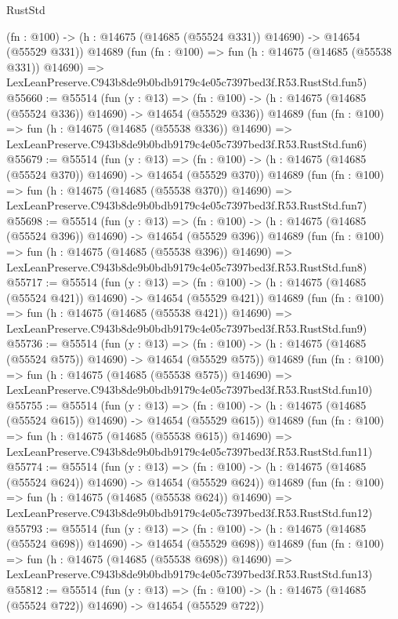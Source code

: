 \begin{lexlean}{RustStd}
\begin{coremodule}
    (fn : @100) -> (h : @14675 (@14685 (@55524 @331)) @14690) -> @14654 (@55529 @331))
    @14689
    (fun (fn : @100) =>
    fun (h : @14675 (@14685 (@55538 @331)) @14690) =>
    LexLeanPreserve.C943b8de9b0bdb9179c4e05c7397bed3f.R53.RustStd.fun5)
@55660 := @55514
    (fun (y : @13) =>
    (fn : @100) -> (h : @14675 (@14685 (@55524 @336)) @14690) -> @14654 (@55529 @336))
    @14689
    (fun (fn : @100) =>
    fun (h : @14675 (@14685 (@55538 @336)) @14690) =>
    LexLeanPreserve.C943b8de9b0bdb9179c4e05c7397bed3f.R53.RustStd.fun6)
@55679 := @55514
    (fun (y : @13) =>
    (fn : @100) -> (h : @14675 (@14685 (@55524 @370)) @14690) -> @14654 (@55529 @370))
    @14689
    (fun (fn : @100) =>
    fun (h : @14675 (@14685 (@55538 @370)) @14690) =>
    LexLeanPreserve.C943b8de9b0bdb9179c4e05c7397bed3f.R53.RustStd.fun7)
@55698 := @55514
    (fun (y : @13) =>
    (fn : @100) -> (h : @14675 (@14685 (@55524 @396)) @14690) -> @14654 (@55529 @396))
    @14689
    (fun (fn : @100) =>
    fun (h : @14675 (@14685 (@55538 @396)) @14690) =>
    LexLeanPreserve.C943b8de9b0bdb9179c4e05c7397bed3f.R53.RustStd.fun8)
@55717 := @55514
    (fun (y : @13) =>
    (fn : @100) -> (h : @14675 (@14685 (@55524 @421)) @14690) -> @14654 (@55529 @421))
    @14689
    (fun (fn : @100) =>
    fun (h : @14675 (@14685 (@55538 @421)) @14690) =>
    LexLeanPreserve.C943b8de9b0bdb9179c4e05c7397bed3f.R53.RustStd.fun9)
@55736 := @55514
    (fun (y : @13) =>
    (fn : @100) -> (h : @14675 (@14685 (@55524 @575)) @14690) -> @14654 (@55529 @575))
    @14689
    (fun (fn : @100) =>
    fun (h : @14675 (@14685 (@55538 @575)) @14690) =>
    LexLeanPreserve.C943b8de9b0bdb9179c4e05c7397bed3f.R53.RustStd.fun10)
@55755 := @55514
    (fun (y : @13) =>
    (fn : @100) -> (h : @14675 (@14685 (@55524 @615)) @14690) -> @14654 (@55529 @615))
    @14689
    (fun (fn : @100) =>
    fun (h : @14675 (@14685 (@55538 @615)) @14690) =>
    LexLeanPreserve.C943b8de9b0bdb9179c4e05c7397bed3f.R53.RustStd.fun11)
@55774 := @55514
    (fun (y : @13) =>
    (fn : @100) -> (h : @14675 (@14685 (@55524 @624)) @14690) -> @14654 (@55529 @624))
    @14689
    (fun (fn : @100) =>
    fun (h : @14675 (@14685 (@55538 @624)) @14690) =>
    LexLeanPreserve.C943b8de9b0bdb9179c4e05c7397bed3f.R53.RustStd.fun12)
@55793 := @55514
    (fun (y : @13) =>
    (fn : @100) -> (h : @14675 (@14685 (@55524 @698)) @14690) -> @14654 (@55529 @698))
    @14689
    (fun (fn : @100) =>
    fun (h : @14675 (@14685 (@55538 @698)) @14690) =>
    LexLeanPreserve.C943b8de9b0bdb9179c4e05c7397bed3f.R53.RustStd.fun13)
@55812 := @55514
    (fun (y : @13) =>
    (fn : @100) -> (h : @14675 (@14685 (@55524 @722)) @14690) -> @14654 (@55529 @722))

\end{coremodule}
\end{lexlean}
